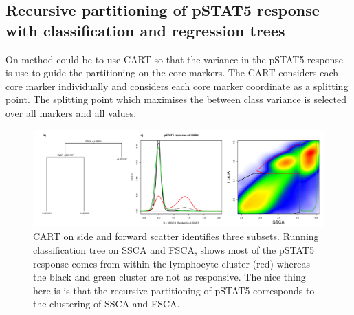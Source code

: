 


\subsection{Recursive partitioning of pSTAT5 response with classification and regression trees} 

On method could be to use \gls{CART} so that the variance in the pSTAT5 response is use to guide the partitioning on the core markers.
The \gls{CART} considers each core marker individually and considers each core marker coordinate as a splitting point.
The splitting point which maximises the between class variance is selected over all markers and all values.





\hspace{-2cm}
\begin{figure}[h]
\centering
\includegraphics[scale=.45]{IL2/figures/pstat5-response-decision-tree.pdf}
{ \gls{CART} on side and forward scatter identifies three subsets. }
{
Running classification tree on SSCA and FSCA, shows most of the pSTAT5 response comes from within the lymphocyte cluster (red) whereas
the black and green cluster are not as responsive.
The nice thing here is is that the recursive partitioning of pSTAT5 corresponds to the clustering of SSCA and FSCA.
}
\end{figure}


